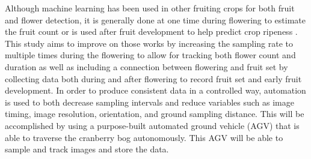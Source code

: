 Although machine learning has been used in other fruiting crops for both fruit and flower detection, it is generally done at one time during flowering \cite{lee_detection_2021} to estimate the fruit count or is used after fruit development to help predict crop ripeness \cite{villacres_detection_2020}. This study aims to improve on those works by increasing the sampling rate to multiple times during the flowering to allow for tracking both flower count and duration as well as including a connection between flowering and fruit set by collecting data both during and after flowering to record fruit set and early fruit development. In order to produce consistent data in a controlled way, automation is used to both decrease sampling intervals and reduce variables such as image timing, image resolution, orientation, and ground sampling distance. This will be accomplished by using a purpose-built automated ground vehicle (AGV) that is able to traverse the cranberry bog autonomously.  This AGV will be able to sample and track images and store the data.


